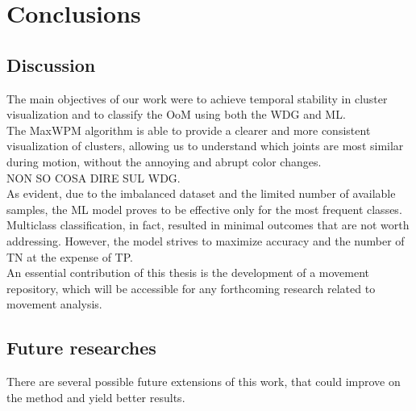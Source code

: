 \chapter{Conclusions}

\section{Discussion}
The main objectives of our work were to achieve temporal stability in cluster visualization and to classify the OoM using both the WDG and ML. \\

The MaxWPM algorithm is able to provide a clearer and more consistent visualization of clusters, allowing us to understand which joints are most similar during motion, without the annoying and abrupt color changes. \\

NON SO COSA DIRE SUL WDG. \\

As evident, due to the imbalanced dataset and the limited number of available samples, the ML model proves to be effective only for the most frequent classes.
Multiclass classification, in fact, resulted in minimal outcomes that are not worth addressing.
However, the model strives to maximize accuracy and the number of TN at the expense of TP. \\

An essential contribution of this thesis is the development of a movement repository, which will be accessible for any forthcoming research related to movement analysis.



\section{Future researches}
There are several possible future extensions of this work, that could improve on the method
and yield better results. \\

